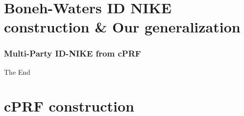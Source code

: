 \documentclass{beamer}
\begin{document}
\section{Boneh-Waters ID NIKE construction & Our generalization}
\begin{frame}
    \frametitle{Multi-Party ID-NIKE from cPRF}
\end{frame}

\begin{frame}
\Huge{\centerline{The End}}
\end{frame}


\section{cPRF construction}
\end{document}
